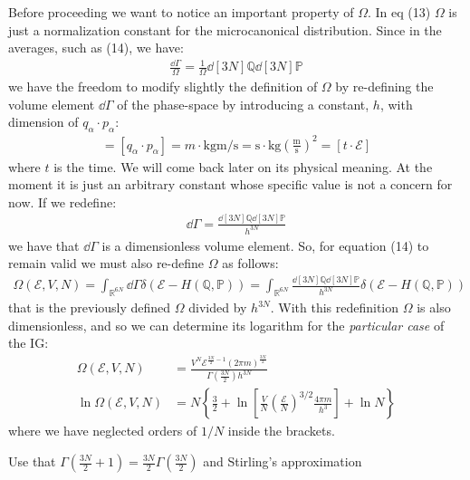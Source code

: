 \documentclass[../../main.tex]{subfiles}
\begin{document}
Before proceeding we want to notice an important property of $\Omega$. In eq (13) $\Omega$ is just a normalization constant for the microcanonical distribution. Since in the averages, such as (14), we have:
\begin{align*}
    \frac{\dd{\Gamma}}{\Omega} = \frac{1}{\Omega} \dd[3N]{\mathbb{Q}} \dd[3N]{\mathbb{P}} 
\end{align*}
we have the freedom to modify slightly the definition of $\Omega$ by re-defining the volume element $\dd{\Gamma}$ of the phase-space by introducing a constant, $h$, with dimension of $q_\alpha \cdot p_\alpha$:
\begin{align*}
    [h] = [q_\alpha \cdot p_{\alpha}] = \si{m}\cdot  \si{\kilo\g \m \per \s} = \si{\s} \cdot \si{\kilo\g} \left(\frac{\si{\m}}{\si{\s}} \right)^2 = [t \cdot \mathcal{E}]
\end{align*}
where $t$ is the time. We will come back later on its physical meaning. At the moment it is just an arbitrary constant whose specific value is not a concern for now. If we redefine:
\begin{align*}
    \dd{\Gamma} = \frac{\dd[3N]{\mathbb{Q}}\dd[3N]{\mathbb{P}}}{h^{3N}} 
\end{align*}
we have that $\dd{\Gamma}$ is a dimensionless volume element. So, for equation (14) to remain valid we must also re-define $\Omega$ as follows:
\begin{align}\label{eqn:omega-redef}
    \Omega(\mathcal{E}, V, N) = \int_{\mathbb{R}^{6N}} \dd{\Gamma} \delta\left(\mathcal{E}- H (\mathbb{Q},\mathbb{P})\right) = \int_{\mathbb{R}^{6N}} \frac{\dd[3N]{\mathbb{Q}} \dd[3N]{\mathbb{P}}}{h^{3N}}  \delta(\mathcal{E}- H(\mathbb{Q},\mathbb{P}))
\end{align}
that is the previously defined $\Omega$ divided by $h^{3N}$. With this redefinition $\Omega$ is also dimensionless, and so we can determine its logarithm for the \textit{particular case} of the IG:
\begin{align} \nonumber
    \Omega(\mathcal{E}, V, N) &= \frac{V^N \mathcal{E}^{\frac{3N}{2} - 1 } (2 \pi m)^{\frac{3N}{2} }}{\Gamma\left(\frac{3N}{2} \right) h^{3N}}\\
\ln \Omega (\mathcal{E}, V, N) &= N\left\{ \frac{3}{2} + \ln\left[\frac{V}{N} \left(\frac{\mathcal{E}}{N} \right)^{3/2} \frac{4 \pi m}{h^3}  \right] + \ln N  \right\} \label{eqn:lnOmega}
\end{align} 
where we have neglected orders of $1/N$ inside the brackets. 

\begin{appr}
    Use that $\Gamma\left(\frac{3N}{2}+1 \right) = \frac{3N}{2} \Gamma\left(\frac{3N}{2} \right)$ and Stirling's approximation
\end{appr}
\end{document}
